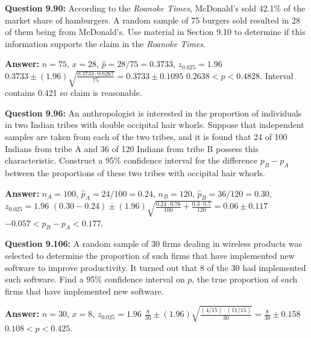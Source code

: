 \documentclass{article}
\begin{document}
\textbf{Question 9.90:}
According to the \textit{Roanoke Times}, McDonald’s
sold 42.1\% of the market share of hamburgers. A random 
sample of 75 burgers sold resulted in 28 of them
being from McDonald’s. Use material in Section 9.10
to determine if this information supports the claim in
the \textit{Roanoke Times}.
\begin{description}
    \item \textbf{Answer:} $n=75$, $x=28$, $\hat{p}=28/75=0.3733$, $z_{0.025}=1.96$\newline
    $0.3733\pm (1.96)\sqrt{\frac{0.3733\cdot 0.6267}{75}} = 0.3733\pm 0.1095$\newline
    \boldmath$0.2638<p<0.4828$. Interval contains 0.421 so claim is reasonable.
\end{description}

\textbf{Question 9.96:}
An anthropologist is interested in the proportion
of individuals in two Indian tribes with double 
occipital hair whorls. Suppose that independent samples are
taken from each of the two tribes, and it is found that
24 of 100 Indians from tribe A and 36 of 120 Indians
from tribe B possess this characteristic. Construct a
95\% confidence interval for the difference $p_B − p_A$ 
between the proportions of these two tribes with occipital
hair whorls.
\begin{description}
    \item \textbf{Answer:} $n_A=100$, $\hat{p}_A=24/100=0.24$, $n_B=120$, $\hat{p}_B=36/120=0.30$, $z_{0.025}=1.96$\newline
    $(0.30-0.24)\pm(1.96)\sqrt{\frac{0.24\cdot 0.76}{100}+\frac{0.3\cdot 0.7}{120}}=0.06\pm 0.117$\newline
    \boldmath$-0.057< p_B-p_A < 0.177$.
\end{description}

\textbf{Question 9.106:}
A random sample of 30 firms dealing in wireless
products was selected to determine the proportion of
such firms that have implemented new software to 
improve productivity. It turned out that 8 of the 30 had
implemented such software. Find a 95\% confidence 
interval on $p$, the true proportion of such firms that have
implemented new software.
\begin{description}
    \item \textbf{Answer:} $n=30$, $x=8$, $z_{0.025}=1.96$\newline
    $\frac{8}{30}\pm(1.96)\sqrt{\frac{(4/15) \cdot (11/15)}{30}}=\frac{8}{30}\pm 0.158$\newline
    \boldmath$0.108<p<0.425$.
\end{description}
\end{document}
